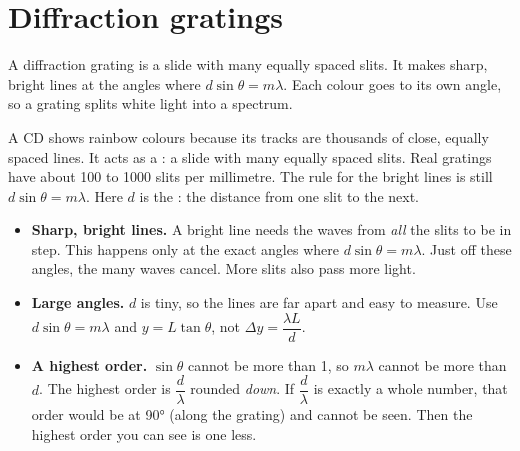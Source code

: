 \section{Diffraction gratings}\label{ch2:sec:gratings}

\begin{bigidea}
A diffraction grating is a slide with many equally spaced slits. It makes sharp, bright
lines at the angles where $d\sin\theta = m\lambda$. Each colour goes to its own angle, so
a grating splits white light into a spectrum.
\end{bigidea}

\begin{keywords}
\end{keywords}

A CD shows rainbow colours because its tracks are thousands of close, equally spaced
lines. It acts as a : a slide with many equally spaced slits.
Real gratings have about 100 to 1000 slits per millimetre. The rule for the bright lines
is still $d\sin\theta = m\lambda$. Here $d$ is the : the distance
from one slit to the next.
\begin{itemize}
  \item \textbf{Sharp, bright lines.} A bright line needs the waves from \emph{all} the
        slits to be in step. This happens only at the exact angles where
        $d\sin\theta = m\lambda$. Just off these angles, the many waves cancel. More slits
        also pass more light.
  \item \textbf{Large angles.} $d$ is tiny, so the lines are far apart and easy to measure.
        Use $d\sin\theta = m\lambda$ and $y = L\tan\theta$, not $\Delta y = \dfrac{\lambda L}{d}$.
  \item \textbf{A highest order.} $\sin\theta$ cannot be more than 1, so $m\lambda$ cannot be
        more than $d$. The highest order is $\dfrac{d}{\lambda}$ rounded \emph{down}. If
        $\dfrac{d}{\lambda}$ is exactly a whole number, that order would be at \ang{90}
        (along the grating) and cannot be seen. Then the highest order you can see is one
        less.
\end{itemize}

